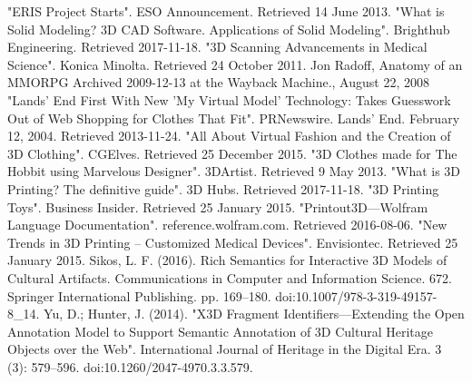  "ERIS Project Starts". ESO Announcement. Retrieved 14 June 2013.
 "What is Solid Modeling? 3D CAD Software. Applications of Solid Modeling". Brighthub Engineering. Retrieved 2017-11-18.
 "3D Scanning Advancements in Medical Science". Konica Minolta. Retrieved 24 October 2011.
 Jon Radoff, Anatomy of an MMORPG Archived 2009-12-13 at the Wayback Machine., August 22, 2008
 "Lands' End First With New 'My Virtual Model' Technology: Takes Guesswork Out of Web Shopping for Clothes That Fit".
 PRNewswire. Lands' End. February 12, 2004. Retrieved 2013-11-24.
 "All About Virtual Fashion and the Creation of 3D Clothing". CGElves. Retrieved 25 December 2015.
 "3D Clothes made for The Hobbit using Marvelous Designer". 3DArtist. Retrieved 9 May 2013.
 "What is 3D Printing? The definitive guide". 3D Hubs. Retrieved 2017-11-18.
 "3D Printing Toys". Business Insider. Retrieved 25 January 2015.
 "Printout3D—Wolfram Language Documentation". reference.wolfram.com. Retrieved 2016-08-06.
 "New Trends in 3D Printing – Customized Medical Devices". Envisiontec. Retrieved 25 January 2015.
 Sikos, L. F. (2016). Rich Semantics for Interactive 3D Models of Cultural Artifacts. Communications in Computer and
 Information Science. 672. Springer International Publishing. pp. 169–180. doi:10.1007/978-3-319-49157-8_14.
 Yu, D.; Hunter, J. (2014). "X3D Fragment Identifiers—Extending the Open Annotation Model to Support Semantic Annotation
 of 3D Cultural Heritage Objects over the Web". International Journal of Heritage in the Digital Era. 3 (3): 579–596.
 doi:10.1260/2047-4970.3.3.579.